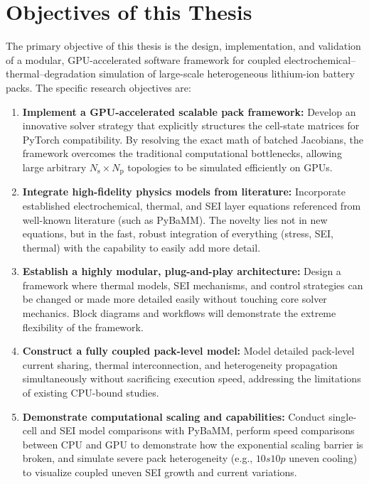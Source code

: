 \section{Objectives of this Thesis}
\label{sec:objectives}

The primary objective of this thesis is the design, implementation, and validation of a modular, GPU-accelerated software framework for coupled electrochemical--thermal--degradation simulation of large-scale heterogeneous lithium-ion battery packs. The specific research objectives are:

\begin{enumerate}
  \item \textbf{Implement a GPU-accelerated scalable pack framework:} Develop an innovative solver strategy that explicitly structures the cell-state matrices for PyTorch compatibility. By resolving the exact math of batched Jacobians, the framework overcomes the traditional computational bottlenecks, allowing large arbitrary $N_\text{s} \times N_\text{p}$ topologies to be simulated efficiently on GPUs.
  
  \item \textbf{Integrate high-fidelity physics models from literature:} Incorporate established electrochemical, thermal, and SEI layer equations referenced from well-known literature (such as PyBaMM). The novelty lies not in new equations, but in the fast, robust integration of everything (stress, SEI, thermal) with the capability to easily add more detail.

  \item \textbf{Establish a highly modular, plug-and-play architecture:} Design a framework where thermal models, SEI mechanisms, and control strategies can be changed or made more detailed easily without touching core solver mechanics. Block diagrams and workflows will demonstrate the extreme flexibility of the framework.

  \item \textbf{Construct a fully coupled pack-level model:} Model detailed pack-level current sharing, thermal interconnection, and heterogeneity propagation simultaneously without sacrificing execution speed, addressing the limitations of existing CPU-bound studies.

  \item \textbf{Demonstrate computational scaling and capabilities:} Conduct single-cell and SEI model comparisons with PyBaMM, perform speed comparisons between CPU and GPU to demonstrate how the exponential scaling barrier is broken, and simulate severe pack heterogeneity (e.g., $10s10p$ uneven cooling) to visualize coupled uneven SEI growth and current variations.
  

\end{enumerate}

